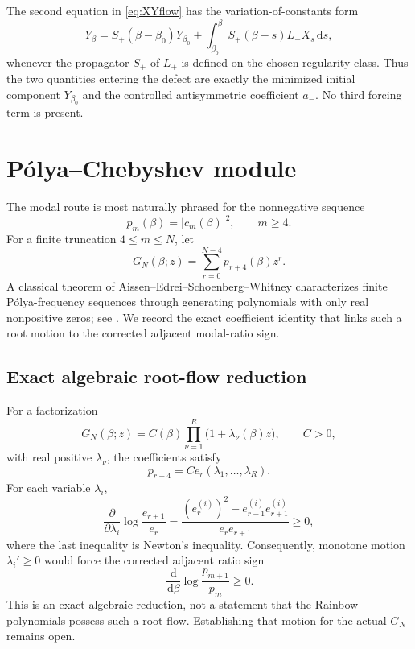 \documentclass[11pt]{amsart}
\numberwithin{equation}{section}
\theoremstyle{plain}
\theoremstyle{definition}
\theoremstyle{remark}
\newcommand{\dd}{\,\mathrm d}
\begin{document}
The second equation in \eqref{eq:XYflow} has the variation-of-constants form
\begin{equation}
\boxed{
Y_\beta
=S_+(\beta-\beta_0)Y_{\beta_0}
+\int_{\beta_0}^{\beta}
S_+(\beta-s)L_-X_s\dd s,
}
\label{eq:Duhamel}
\end{equation}
whenever the propagator $S_+$ of $L_+$ is defined on the chosen regularity class.  Thus the two quantities entering the defect are exactly the minimized initial component $Y_{\beta_0}$ and the controlled antisymmetric coefficient $a_-$.  No third forcing term is present.

\section{Pólya--Chebyshev module}
\label{sec:polya}

The modal route is most naturally phrased for the nonnegative sequence
\begin{equation}
p_m(\beta)=|c_m(\beta)|^2,
\qquad m\ge4.
\end{equation}
For a finite truncation $4\le m\le N$, let
\begin{equation}
\boxed{
G_N(\beta;z)=\sum_{r=0}^{N-4}p_{r+4}(\beta)z^r.
}
\label{eq:GN}
\end{equation}
A classical theorem of Aissen--Edrei--Schoenberg--Whitney characterizes finite Pólya-frequency sequences through generating polynomials with only real nonpositive zeros; see \cite{Aissen1951,Schoenberg1951}.  We record the exact coefficient identity that links such a root motion to the corrected adjacent modal-ratio sign.

\subsection{Exact algebraic root-flow reduction}
\label{subsec:polya-reduction}

For a factorization
\begin{equation}
G_N(\beta;z)
=C(\beta)\prod_{\nu=1}^{R}\bigl(1+\lambda_\nu(\beta)z\bigr),
\qquad C>0,
\label{eq:GN-factor}
\end{equation}
with real positive $\lambda_\nu$, the coefficients satisfy
\begin{equation}
p_{r+4}=C e_r(\lambda_1,\ldots,\lambda_R).
\label{eq:p-er}
\end{equation}
For each variable $\lambda_i$,
\begin{equation}
\boxed{
\frac{\partial}{\partial\lambda_i}
\log\frac{e_{r+1}}{e_r}
=
\frac{(e_r^{(i)})^2-e_{r-1}^{(i)}e_{r+1}^{(i)}}{e_re_{r+1}}
\ge0,
}
\label{eq:newton-ratio}
\end{equation}
where the last inequality is Newton's inequality.  Consequently, monotone motion $\lambda_i'\ge0$ would force the corrected adjacent ratio sign
\begin{equation}
\frac{\dd}{\dd\beta}\log\frac{p_{m+1}}{p_m}\ge0.
\label{eq:polya-RC}
\end{equation}
This is an exact algebraic reduction, not a statement that the Rainbow polynomials possess such a root flow.  Establishing that motion for the actual $G_N$ remains open.
\end{document}
